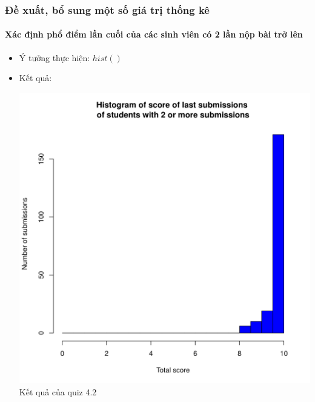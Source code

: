 \documentclass[english,10pt,table]{beamer}
\begin{document}
\frame
{
\frametitle{Đề xuất, bổ sung một số giá trị thống kê}
\framesubtitle{Xác định phổ điểm lần cuối của các sinh viên có 2 lần nộp bài trở lên}
\begin{itemize}
    \item Ý tưởng thực hiện: $hist()$
    \item Kết quả:\\
    \begin{center}
        \includegraphics[width = 6 cm]{Images/img12-7-4.png}\\
        Kết quả của quiz 4.2
    \end{center}
\end{itemize}
}
\end{document}
